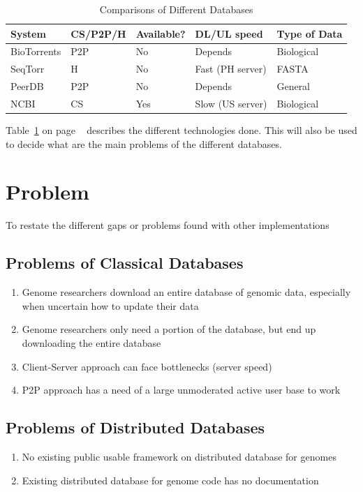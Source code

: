 \documentclass{article}
\begin{document}
\begin{table}[h]
    \caption{Comparisons of Different Databases}
    \begin{tabular}{|l|l|l|l|l|}
    \hline
    System      & CS/P2P/H & Available? & DL/UL speed & Type of Data \\ \hline
    BioTorrents & P2P           & No         & Depends                    & Biological  \\ \hline
    SeqTorr     & H             & No         & Fast (PH server)           & FASTA        \\ \hline
    PeerDB      & P2P           & No         & Depends                    & General      \\ \hline
    NCBI        & CS            & Yes        & Slow (US server)           & Biological  \\ \hline
    \end{tabular}
    \label{table:database_comparison_table}
\end{table} 

Table~\ref{table:database_comparison_table} on page ~\pageref{table:database_comparison_table} describes the different technologies done. This will also be used to decide what are the main problems of the different databases.


\section{Problem}
To restate the different gaps or problems found with other implementations
\subsection{Problems of Classical Databases}
\begin{enumerate}
\item Genome researchers download an entire database of genomic data, especially when uncertain how to update their data
\item Genome researchers only need a portion of the database, but end up downloading the entire database
\item Client-Server approach can face bottlenecks (server speed)
\item P2P approach has a need of a large unmoderated active user base to work

\end{enumerate}

\subsection{Problems of Distributed Databases}
\begin{enumerate}
    \item No existing public usable framework on distributed database for genomes
    \item Existing distributed database for genome code has no documentation
\end{enumerate}
\end{document}
